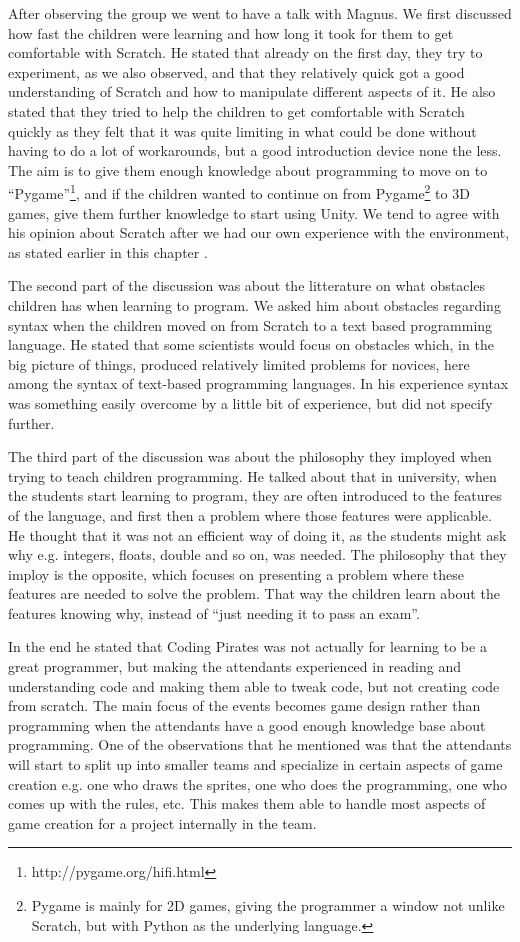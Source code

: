 After observing the group we went to have a talk with Magnus. We first discussed how fast the children were learning and how long it took for them to get comfortable with Scratch. He stated that already on the first day, they try to experiment, as we also observed, and that they relatively quick got a good understanding of Scratch and how to manipulate different aspects of it. He also stated that they tried to help the children to get comfortable with Scratch quickly as they felt that it was quite limiting in what could be done without having to do a lot of workarounds, but a good introduction device none the less. The aim is to give them enough knowledge about programming to move on to ``Pygame''\footnote{http://pygame.org/hifi.html}, and if the children wanted to continue on from Pygame\footnote{Pygame is mainly for 2D games, giving the programmer a window not unlike Scratch, but with Python as the underlying language.} to 3D games, give them further knowledge to start using Unity. We tend to agree with his opinion about Scratch after we had our own experience with the environment, as stated earlier in this chapter .

The second part of the discussion was about the litterature on what obstacles children has when learning to program. We asked him about obstacles regarding syntax when the children moved on from Scratch to a text based programming language. He stated that some scientists would focus on obstacles which, in the big picture of things, produced relatively limited problems for novices, here among the syntax of text-based programming languages. In his experience syntax was something easily overcome by a little bit of experience, but did not specify further.

The third part of the discussion was about the philosophy they imployed when trying to teach children programming. He talked about that in university, when the students start learning to program, they are often introduced to the features of the language, and first then a problem where those features were applicable. He thought that it was not an efficient way of doing it, as the students might ask why e.g. integers, floats, double and so on, was needed. The philosophy that they imploy is the opposite, which focuses on presenting a problem where these features are needed to solve the problem. That way the children learn about the features knowing why, instead of ``just needing it to pass an exam''.

In the end he stated that Coding Pirates was not actually for learning to be a great programmer, but making the attendants experienced in reading and understanding code and making them able to tweak code, but not creating code from scratch. The main focus of the events becomes game design rather than programming when the attendants have a good enough knowledge base about programming. One of the observations that he mentioned was that the attendants will start to split up into smaller teams and specialize in certain aspects of game creation e.g. one who draws the sprites, one who does the programming, one who comes up with the rules, etc. This makes them able to handle most aspects of game creation for a project internally in the team.
